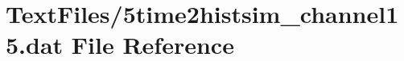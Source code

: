 \hypertarget{5time2histsim__channel15_8dat}{}\section{Text\+Files/5time2histsim\+\_\+channel15.dat File Reference}
\label{5time2histsim__channel15_8dat}
